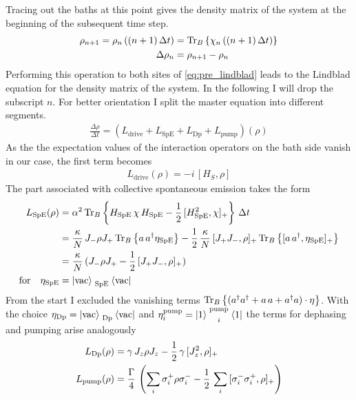 Tracing out the baths at this point gives the density matrix of the system at the beginning of the subsequent time step. 
\begin{align*}
    \rho_{n+1}=\rho_n\left((n+1)\,\Delta t\right)&=\text{Tr}_B\left\{\chi_n\left((n+1)\,\Delta t\right)\right\}\\
    \Delta\rho_n&=\rho_{n+1}-\rho_n
\end{align*}
Performing this operation to both sites of \eqref{eq:pre_lindblad} leads to the Lindblad equation for the density matrix of the system. In the following I will drop the subscript $n$. For better orientation I split the master equation into different segments.
\begin{align*}
    \frac{\Delta\rho}{\Delta t}=\left(L_\text{drive}+L_\text{SpE}+L_\text{Dp}+L_\text{pump}\right)(\rho)
\end{align*}
As the the expectation values of the interaction operators on the bath side vanish in our case, the first term becomes
\begin{align*}
    L_\text{drive}(\rho)=-i\,[H_S,\rho]
\end{align*}
The part associated with collective spontaneous emission takes the form
\begin{align*}
    L_\text{SpE}(\rho) &= \alpha^2\,\text{Tr}_B\left\{H_\text{SpE}\,\chi \,H_\text{SpE}-\frac{1}{2}\,[H_\text{SpE}^2,\chi]_+\right\}\,\Delta t\\
    &= \frac{\kappa}{N}\,J_-\rho J_+\,\text{Tr}_B\left\{a\,a^\dagger\eta_\text{SpE}\right\}-\frac{1}{2}\,\frac{\kappa}{N}\,[J_+J_-,\rho]_+\,\text{Tr}_B\left\{[a\,a^\dagger,\eta_\text{SpE}]_+\right\}\\
    &=\frac{\kappa}{N}\,(J_-\rho J_+-\frac{1}{2}\,[J_+J_-,\rho]_+)\\
    \text{for}\quad\eta_\text{SpE}&=\ket{\text{vac}}\mathrel{\substack{\,\\\,\\ \text{SpE}}}\bra{\text{vac}}
\end{align*}
From the start I excluded the vanishing terms $\text{Tr}_B\left\{(a^\dagger a^\dagger+a\,a+a^\dagger a)\cdot\eta\right\}$. With the choice $\eta_\text{Dp}=\ket{\text{vac}}\mathrel{\substack{\,\\\,\\ \text{Dp}}}\bra{\text{vac}}$ and $\eta^\text{pump}_i=\ket{1}\mathrel{\substack{\text{pump}\\\,\\ i}}\bra{1}$ the terms for dephasing and pumping arise analogously
\begin{align}
    L_\text{Dp}(\rho)%
    &=\gamma\,J_z\rho J_z-\half\,\gamma\,[J_z^2,\rho]_+\\
    L_\text{pump}(\rho)%
    &=\frac{\Gamma}{4}\,\left(\sum_i\sigma_i^+\rho \sigma_i^--\half\,\sum_i\,[\sigma_i^-\sigma_i^+,\rho]_+\right)\label{eq:pumping_Lindblad_op}
\end{align}
